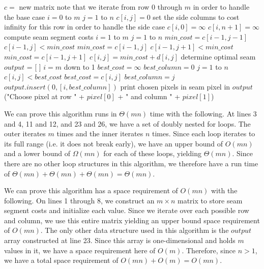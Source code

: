 \documentclass[11pt]{article}
\begin{document}
\begin{codebox}
\li $c =$ new matrix
\li \Comment note that we iterate from row 0 through $m$ in order to handle the base case
\li \For $i=0$ to $m$ \Do
\li     \For $j=1$ to $n$ \Do
\li         $c[i,j] = 0$
        \End
\li     \Comment set the side columns to cost infinity for this row in order to handle the side case
\li     $c[i,0] = \infty$
\li     $c[i,n+1] = \infty$
\li \End
\li \Comment compute seam segment costs
\li \For $i=1$ to $m$ \Do
\li     \For $j=1$ to $n$ \Do
\li         $min\_cost = c[i-1,j-1]$
\li         \If $c[i-1,j] < min\_cost$ \Then
\li             $min\_cost = c[i-1,j]$
            \End
\li         \If $c[i-1,j+1] < min\_cost$ \Then
\li             $min\_cost = c[i-1,j+1]$
            \End
\li
\li         $c[i,j] = min\_cost + d[i,j]$
        \End
\li \End
\li \Comment determine optimal seam
\li $output$ = [ ]
\li \For $i=m$ down to 1 \Do
\li     $best\_cost = \infty$
\li     $best\_column = 0$
\li     \For $j=1$ to $n$ \Do
\li         \If $c[i,j] < best\_cost$ \Then
\li             $best\_cost = c[i,j]$
\li             $best\_column = j$
\li         \End
        \End
\li     $output.insert(0, [i,best\_column])$
\li \End
\li \Comment print chosen pixels in seam
\li \For pixel in $output$ \Do
\li     {}("Choose pixel at row " + $pixel[0]$ + " and column " + $pixel[1]$)
\end{codebox}

We can prove this algorithm runs in $\Theta(mn)$ time with the following. At lines 3 and 4, 11 and 12, and 23 and 26, we have a set of doubly nested for loops. The outer iterates $m$ times and the inner iterates $n$ times. Since each loop iterates to its full range (i.e. it does not break early), we have an upper bound of $O(mn)$ and a lower bound of $\Omega(mn)$ for each of these loops, yielding $\Theta(mn)$. Since there are no other loop structures in this algorithm, we therefore have a run time of $\Theta(mn) + \Theta(mn) + \Theta(mn) = \Theta(mn)$.

We can prove this algorithm has a space requirement of $O(mn)$ with the following. On lines 1 through 8, we construct an $m \times n$ matrix to store seam segment costs and initialize each value. Since we iterate over each possible row and column, we use this entire matrix yielding an upper bound space requirement of $O(mn)$. The only other data structure used in this algorithm is the $output$ array constructed at line 23. Since this array is one-dimensional and holds $m$ values in it, we have a space requirement here of $O(m)$. Therefore, since $n > 1$, we have a total space requirement of $O(mn) + O(m) = O(mn)$.
\end{document}
